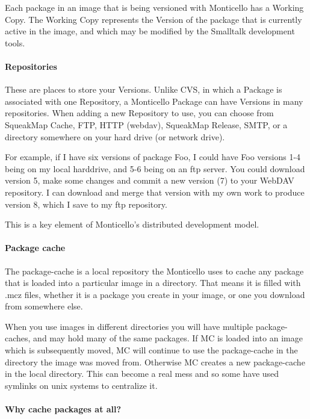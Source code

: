 Each package in an image that is being versioned with Monticello has a Working Copy. The Working Copy represents the Version of the package that is currently active in the image, and which may be modified by the Smalltalk development tools.

\paragraph{Repositories}

These are places to store your Versions. Unlike CVS, in which a Package is associated with one Repository, a Monticello Package can have Versions in many repositories. When adding a new Repository to use, you can choose from SqueakMap Cache, FTP, HTTP (webdav), SqueakMap Release, SMTP, or a directory somewhere on your hard drive (or network drive).

For example, if I have six versions of package Foo, I could have Foo versions 1-4 being on my local harddrive, and 5-6 being on an ftp server. You could download version 5, make some changes and commit a new version (7) to your WebDAV repository. I can download and merge that version with my own work to produce version 8, which I save to my ftp repository.

This is a key element of Monticello's distributed development model.

\paragraph{Package cache}

The package-cache is a local repository the Monticello uses to cache any package that is loaded into a particular image in a directory. That means it is filled with .mcz files, whether it is a package you create in your image, or one you download from somewhere else.

When you use images in different directories you will have multiple package-caches, and may hold many of the same packages. If MC is loaded into an image which is subsequently moved, MC will continue to use the package-cache in the directory the image was moved from. Otherwise MC creates a new package-cache in the local directory. This can become a real mess and so some have used symlinks on unix systems to centralize it.

\paragraph{Why cache packages at all?}


